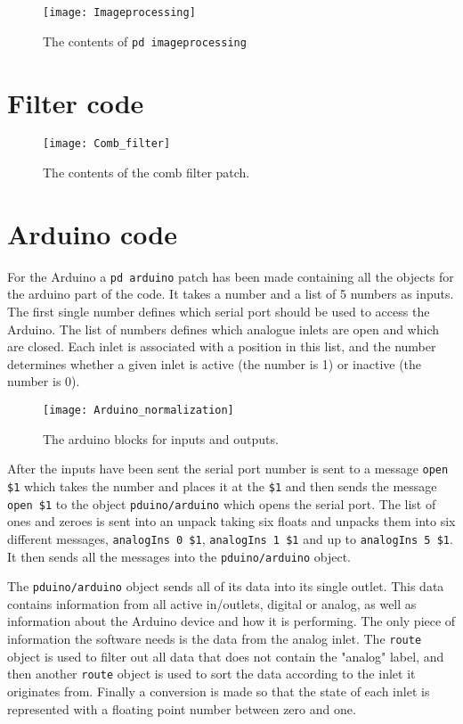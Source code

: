 \begin{figure}
\centering
\texttt{[image: Imageprocessing]}
\caption{The contents of \texttt{pd imageprocessing}}
\label{Fig:Imageprocessing}
\end{figure}

\section{Filter code}

\begin{figure}
\centering
\texttt{[image: Comb\_filter]}
\caption{The contents of the comb filter patch.}
\label{Fig:Comb_filter}
\end{figure}

\section{Arduino code}
For the Arduino a \texttt{pd arduino} patch has been made containing all the objects for the arduino part of the code. It takes a number and a list of 5 numbers as inputs. The first single number defines which serial port should be used to access the Arduino. The list of numbers defines which analogue inlets are open and which are closed. Each inlet is associated with a position in this list, and the number determines whether a given inlet is active (the number is 1) or inactive (the number is 0).

\begin{figure}
\centering
\texttt{[image: Arduino\_normalization]}
\caption{The arduino blocks for inputs and outputs.}
\label{Fig:Arudino_normalization}
\end{figure}

After the inputs have been sent the serial port number is sent to a message \texttt{open \$1} which takes the number and places it at the \texttt{\$1} and then sends the message \texttt{open \$1} to the object \texttt{pduino/arduino}
which opens the serial port. The list of ones and zeroes is sent into an unpack taking six floats and unpacks them into six different messages, \texttt{analogIns 0 \$1}, \texttt{analogIns 1 \$1} and up to \texttt{analogIns 5 \$1}. It then sends all the messages into the \texttt{pduino/arduino} object.

The \texttt{pduino/arduino} object sends all of its data into its single outlet. This data contains information from all active in/outlets, digital or analog, as well as information about the Arduino device and how it is performing. The only piece of information the software needs is the data from the analog inlet. The \texttt{route} object is used to filter out all data that does not contain the "analog" label, and then another \texttt{route} object is used to sort the data according to the inlet it originates from. Finally a conversion is made so that the state of each inlet is represented with a floating point number between zero and one.


